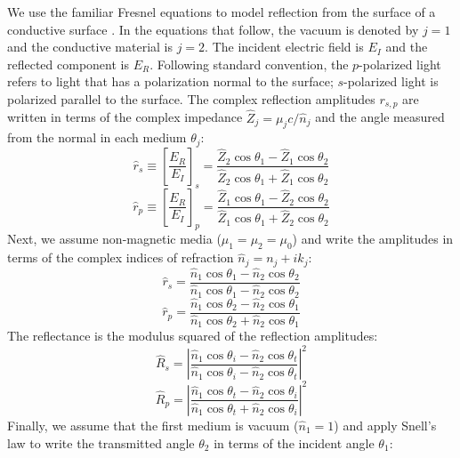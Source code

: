 We use the familiar Fresnel equations to model reflection from the surface of a conductive surface \cite{zangwillModernElectrodynamics2013}. In the equations that follow, the vacuum is denoted by $j=1$ and the conductive material is $j=2$. The incident electric field is $E_I$ and the reflected component is $E_R$. Following standard convention, the $p$-polarized light refers to light that has a polarization normal to the surface; $s$-polarized light is polarized parallel to the surface. The complex reflection amplitudes $r_{s,p}$ are written in terms of the complex impedance $\hat{Z}_j = \mu_j c / \hat{n}_j$ and the angle measured from the normal in each medium $\theta_j$:
\begin{equation}
\hat{r}_s \equiv \left[ \frac{E_R}{E_I} \right]_s = \frac{\hat{Z}_2 \cos \theta_1 - \hat{Z}_1 \cos \theta_2}{\hat{Z}_2 \cos \theta_1 + \hat{Z}_1 \cos \theta_2}
\label{eqn:Fresnel_rs_1}
\end{equation}
\begin{equation}
\hat{r}_p \equiv \left[ \frac{E_R}{E_I} \right]_p = \frac{\hat{Z}_1 \cos \theta_1 - \hat{Z}_2 \cos \theta_2}{\hat{Z}_1 \cos \theta_1 + \hat{Z}_2 \cos \theta_2}
\label{eqn:Fresnel_rp_1}
\end{equation}
Next, we assume non-magnetic media ($\mu_1=\mu_2=\mu_0$) and write the amplitudes in terms of the complex indices of refraction $\hat{n}_j = n_j + i k_j$:
\begin{equation}
\hat{r}_s = \frac{\hat{n}_1 \cos \theta_1 - \hat{n}_2 \cos \theta_2}{\hat{n}_1 \cos \theta_1 - \hat{n}_2 \cos \theta_2}
\label{eqn:Fresnel_rs_2}
\end{equation}
\begin{equation}
\hat{r}_p = \frac{\hat{n}_1 \cos \theta_2 - \hat{n}_2 \cos \theta_1}{\hat{n}_1 \cos \theta_2 + \hat{n}_2 \cos \theta_1}
\label{eqn:Fresnel_rp_2}
\end{equation}
The reflectance is the modulus squared of the reflection amplitudes:
\begin{equation}
\hat{R}_s = \left| \frac{\hat{n}_1 \cos \theta_i - \hat{n}_2 \cos \theta_t}{\hat{n}_1 \cos \theta_i - \hat{n}_2 \cos \theta_t} \right|^2
\label{eqn:Fresnel_Rs_1}
\end{equation}
\begin{equation}
\hat{R}_p = \left| \frac{\hat{n}_1 \cos \theta_t - \hat{n}_2 \cos \theta_i}{\hat{n}_1 \cos \theta_t + \hat{n}_2 \cos \theta_i} \right|^2
\label{eqn:Fresnel_Rp_1}
\end{equation}
Finally, we assume that the first medium is vacuum ($\hat{n}_1 = 1$) and apply Snell's law to write the transmitted angle $\theta_2$ in terms of the incident angle $\theta_1$:

